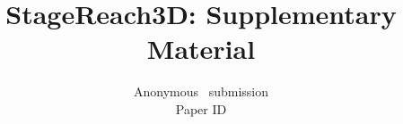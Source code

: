 \documentclass[10pt,twocolumn,letterpaper]{article}
\title{StageReach3D: Supplementary Material}
\author{Anonymous \confName~submission\\
Paper ID \paperID}
\begin{document}
\maketitle












\clearpage
\onecolumn

\end{document}
